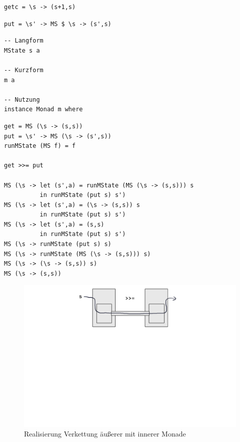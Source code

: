 		\begin{lstlisting}
getc = \s -> (s+1,s)
		\end{lstlisting}

		\begin{lstlisting}
put = \s' -> MS $ \s -> (s',s)
		\end{lstlisting}

		\begin{lstlisting}
-- Langform
MState s a

-- Kurzform
m a

-- Nutzung
instance Monad m where
		\end{lstlisting}

		\lstHaskell[detaillierte Aufschlüsselung anhand von \texttt{get >>= put}]
		\begin{lstlisting}
get = MS (\s -> (s,s))
put = \s' -> MS (\s -> (s',s))
runMState (MS f) = f

get >>= put

MS (\s -> let (s',a) = runMState (MS (\s -> (s,s))) s
          in runMState (put s) s')
MS (\s -> let (s',a) = (\s -> (s,s)) s
          in runMState (put s) s')
MS (\s -> let (s',a) = (s,s)
          in runMState (put s) s')
MS (\s -> runMState (put s) s)
MS (\s -> runMState (MS (\s -> (s,s))) s)
MS (\s -> (\s -> (s,s)) s)
MS (\s -> (s,s))
		\end{lstlisting}
		
		\begin{figure}[ht]
			\caption{Realisierung Verkettung äußerer mit innerer Monade}
			\includegraphics[width=\textwidth]{workfiles/v8_1}
		\end{figure}


